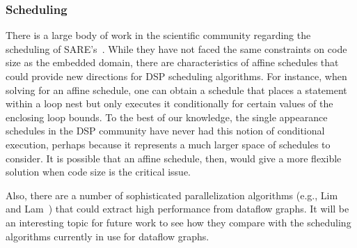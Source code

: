 \subsubsection{Scheduling}

There is a large body of work in the scientific community regarding
the scheduling of SARE's~\cite{DRV00}.  While they have not faced the
same constraints on code size as the embedded domain, there are
characteristics of affine schedules that could provide new directions
for DSP scheduling algorithms.  For instance, when solving for an
affine schedule, one can obtain a schedule that places a statement
within a loop nest but only executes it conditionally for certain
values of the enclosing loop bounds.  To the best of our knowledge,
the single appearance schedules in the DSP community have never had
this notion of conditional execution, perhaps because it represents a
much larger space of schedules to consider.  It is possible that an
affine schedule, then, would give a more flexible solution when code
size is the critical issue.

Also, there are a number of sophisticated parallelization algorithms
(e.g., Lim and Lam~\cite{Lim01}) that could extract high performance
from dataflow graphs.  It will be an interesting topic for future work
to see how they compare with the scheduling algorithms currently in
use for dataflow graphs.







